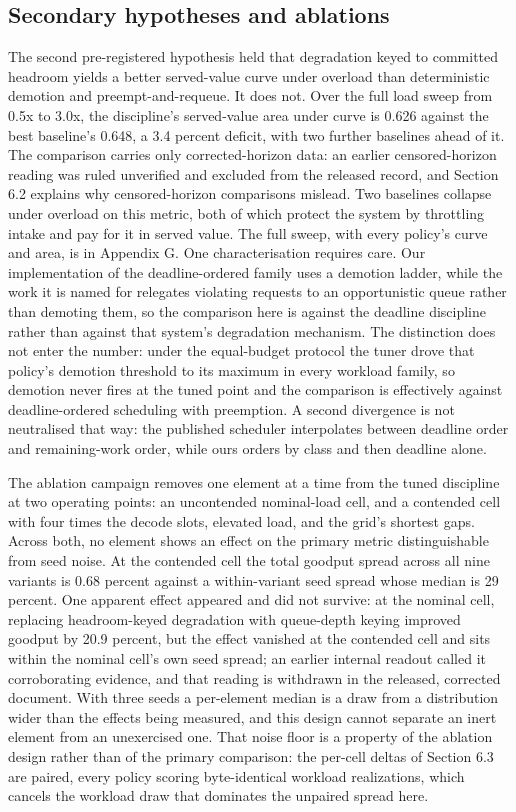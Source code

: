 \subsection{Secondary hypotheses and ablations}

The second pre-registered hypothesis held that degradation keyed to
committed headroom yields a better served-value curve under overload
than deterministic demotion and preempt-and-requeue. It does not. Over
the full load sweep from 0.5x to 3.0x, the discipline's served-value
area under curve is 0.626 against the best baseline's 0.648, a 3.4
percent deficit, with two further baselines ahead of it. The comparison
carries only corrected-horizon data: an earlier censored-horizon reading
was ruled unverified and excluded from the released record, and Section
6.2 explains why censored-horizon comparisons mislead. Two baselines
collapse under overload on this metric, both of which protect the system
by throttling intake and pay for it in served value. The full sweep,
with every policy's curve and area, is in Appendix G. One
characterisation requires care. Our implementation of the
deadline-ordered family uses a demotion ladder, while the work it is
named for relegates violating requests to an opportunistic queue rather
than demoting them, so the comparison here is against the deadline
discipline rather than against that system's degradation mechanism. The
distinction does not enter the number: under the equal-budget protocol
the tuner drove that policy's demotion threshold to its maximum in every
workload family, so demotion never fires at the tuned point and the
comparison is effectively against deadline-ordered scheduling with
preemption. A second divergence is not neutralised that way: the
published scheduler interpolates between deadline order and
remaining-work order, while ours orders by class and then deadline
alone.

The ablation campaign removes one element at a time from the tuned
discipline at two operating points: an uncontended nominal-load cell, and
a contended cell with four times the decode slots, elevated load, and the
grid's shortest gaps. Across both, no element shows an effect on the
primary metric distinguishable from seed noise. At the contended cell the
total goodput spread across all nine variants is 0.68 percent against a
within-variant seed spread whose median is 29 percent. One apparent
effect appeared and did not survive: at the nominal cell, replacing
headroom-keyed degradation with queue-depth keying improved goodput by
20.9 percent, but the effect vanished at the contended cell and sits
within the nominal cell's own seed spread; an earlier internal readout
called it corroborating evidence, and that reading is withdrawn in the
released, corrected document. With three seeds a per-element median is a
draw from a distribution wider than the effects being measured, and this
design cannot separate an inert element from an unexercised one. That
noise floor is a property of the ablation design rather than of the
primary comparison: the per-cell deltas of Section 6.3 are paired, every
policy scoring byte-identical workload realizations, which cancels the
workload draw that dominates the unpaired spread here.

